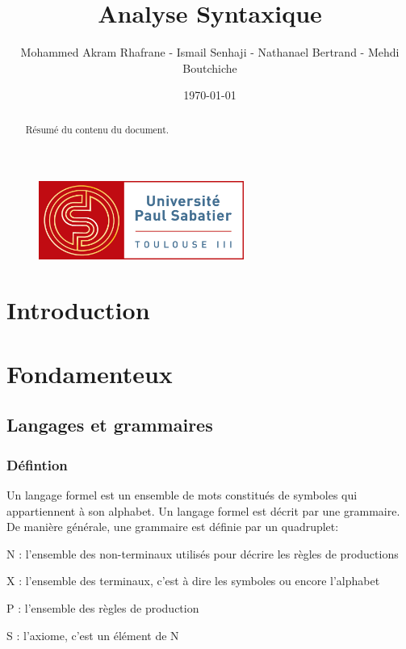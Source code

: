 \documentclass{article}
\title{Analyse Syntaxique}
\author{Mohammed Akram Rhafrane - Ismail Senhaji - Nathanael Bertrand - Mehdi Boutchiche\\}
\date{\today}
\begin{document}
\begin{figure}[t]
	\centering
		\includegraphics[width=0.60\textwidth]{logo-ups.jpg}
	\label{fig:logo-ups}
\end{figure}

\maketitle

\newpage
\tableofcontents

\newpage
\begin{abstract}
Résumé du contenu du document.
\end{abstract}

\newpage
\section{Introduction}
\label{hints}

\newpage
\section{Fondamenteux}
\label{hints}
\subsection{Langages et grammaires}
\subsubsection{Défintion}
Un langage formel est un ensemble de mots constitués de symboles qui appartiennent à son alphabet.
Un langage formel est décrit par une grammaire.
De manière générale, une grammaire est définie par un quadruplet:

    N : l’ensemble des non-terminaux utilisés pour décrire les règles de productions

    X : l’ensemble des terminaux, c’est à dire les symboles ou encore l’alphabet

    P : l’ensemble des règles de production

    S : l’axiome, c’est un élément de N
\newline
\end{document}
